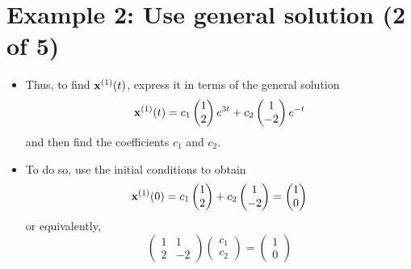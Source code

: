 \documentclass[11pt,a4paper]{article}
\begin{document}
	\section*{Example 2: Use general solution (2 of 5)}
	\begin{itemize}
		\item Thus, to find $\vb{x}^{(1)}(t)$, express it in terms of the general solution
		$$
		\vb{x}^{(1)}(t) = c_1
		\begin{pmatrix}
			1\\
			2
		\end{pmatrix}e^{3t} + c_2
		\begin{pmatrix}
			1\\
			-2
		\end{pmatrix}e^{-t}
		$$
		and then find the coefficients $c_1$ and $c_2$. 
		\item To do so, use the initial conditions to obtain
		$$
		\vb{x}^{(1)}(0) = c_1
		\begin{pmatrix}
			1\\
			2
		\end{pmatrix} + c_2
		\begin{pmatrix}
			1\\
			-2
		\end{pmatrix}=
		\begin{pmatrix}
			1\\
			0
		\end{pmatrix}
		$$
		or equivalently,
		$$
		\begin{pmatrix}
			1 & 1\\
			2 & -2
		\end{pmatrix}
		\begin{pmatrix}
			c_1\\
			c_2
		\end{pmatrix}=
		\begin{pmatrix}
			1\\
			0
		\end{pmatrix}
		$$
	\end{itemize}
\end{document}

